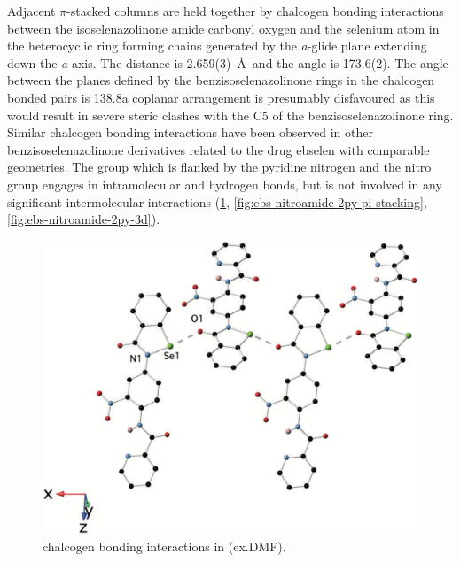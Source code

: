 \begin{refsection}
Adjacent $\pi$-stacked columns are held together by chalcogen bonding interactions between the isoselenazolinone amide carbonyl oxygen and the selenium atom in the heterocyclic ring forming chains generated by the \emph{a}-glide plane extending down the \emph{a}-axis.
The  distance is 2.659(3)~\AA~and the  angle is 173.6(2)\degree.
The angle between the planes defined by the benzisoselenazolinone rings in the chalcogen bonded pairs is 138.8\degree a coplanar arrangement is presumably disfavoured as this would result in severe steric clashes with the C5 of the benzisoselenazolinone ring. 
Similar  chalcogen bonding interactions have been observed in other benzisoselenazolinone derivatives related to the drug ebselen with comparable geometries.\autocite{Fellowes2019,Thomas2015,Bhabak2007,Piatek1995} 
The  group which is flanked by the pyridine nitrogen and the nitro group engages in intramolecular  and  hydrogen bonds, but is not involved in any significant intermolecular interactions (\cref{fig:ebs-nitroamide-2py-o-se}, \cref{fig:ebs-nitroamide-2py-pi-stacking}, \cref{fig:ebs-nitroamide-2py-3d}).

\begin{figure}
    \centering
    \includegraphics[width=0.8\linewidth]{Figures/ebs-nitroamide-2py-o-se.pdf}
    \caption{ chalcogen bonding interactions in (ex.DMF).}
    \label{fig:ebs-nitroamide-2py-o-se}
\end{figure}


\end{refsection}
